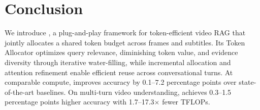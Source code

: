 \section{Conclusion}
\label{sec:conclusion}


We introduce \name, a plug-and-play framework for token-efficient video RAG that jointly allocates a shared token budget across frames and subtitles. Its Token Allocator optimizes query relevance, diminishing token value, and evidence diversity through iterative water-filling, while incremental allocation and attention refinement enable efficient reuse across conversational turns. At comparable compute, \name improves accuracy by 0.1--7.2 percentage points over state-of-the-art baselines. On multi-turn video understanding, \name achieves 0.3--1.5 percentage points higher accuracy with 1.7--17.3$\times$ fewer TFLOPs.



